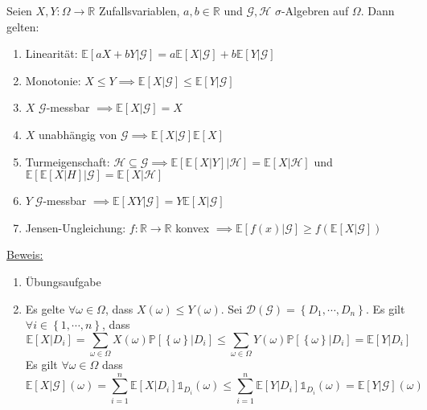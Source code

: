 Seien $ X, Y : \Omega  \to \mathbb{R} $ Zufallsvariablen, $ a,b \in \mathbb{R} $ und $ \mathcal{G}, \mathcal{H}  $ $\sigma$-Algebren auf 
$ \Omega  $. Dann gelten:
\begin{enumerate}[label=\alph*)]
	\item Linearität: $ \mathbb{E} \left[ aX + bY | \mathcal{G} \right] = a \mathbb{E} \left[ X | \mathcal{G} \right] + b \mathbb{E} \left[ Y | \mathcal{G}\right] $ 
	\item Monotonie: $ X \leq Y \implies \mathbb{E} \left[ X | \mathcal{G} \right] \leq \mathbb{E} \left[ Y | \mathcal{G} \right] $ 
	\item $ X  $ $ \mathcal{G}$-messbar $ \implies \mathbb{E} \left[ X | \mathcal{G} \right] = X $  
	\item $ X $ unabhängig von $ \mathcal{G}  \implies \mathbb{E} \left[ X  | \mathcal{G} \right] \mathbb{E} \left[ X \right]$ 
	\item Turmeigenschaft: $ \mathcal{H} \subseteq \mathcal{G} \implies \mathbb{E} \left[ \mathbb{E} \left[ X | Y \right] | \mathcal{H} \right] = \mathbb{E} \left[ X | \mathcal{H} \right] $ und $ \mathbb{E} \left[ \mathbb{E} \left[ X | H \right]| \mathcal{G} \right] = \mathbb{E} \left[ X | \mathcal{H} \right] $ 
	\item $ Y \; \mathcal{G}$-messbar $ \implies \mathbb{E} \left[ X Y | \mathcal{G} \right] = Y \mathbb{E} \left[ X | \mathcal{G} \right] $
	\item Jensen-Ungleichung: $ f : \mathbb{R} \to \mathbb{R}  $ konvex $ \implies \mathbb{E} \left[ f (x) | \mathcal{G} \right] \geq 
		f \left( \mathbb{E} \left[ X | \mathcal{G} \right] \right)$ 
\end{enumerate}

\underline{Beweis:} \begin{enumerate}[label=\alph*)]
	\item Übungsaufgabe
	\item Es gelte $ \forall \omega  \in \Omega  $, dass $ X (\omega) \leq Y (\omega) $. Sei $ \mathcal{D} (\mathcal{G}) =  \left\{ D_1 , \cdots,  D_n \right\}$. Es gilt $ \forall i \in \left\{ 1 , \cdots,  n \right\} $, dass 
		$$ \mathbb{E} \left[ X | D_i \right] = \sum_{\omega  \in \Omega } X (\omega) \mathbb{P} \left[ \left\{ \omega  \right\} | D_i \right] \leq \sum_{\omega  \in \Omega } Y (\omega) \mathbb{P} \left[ \left\{ \omega  \right\} | D_i \right] = \mathbb{E} \left[ Y | D_i \right] $$
Es gilt $ \forall \omega  \in \Omega  $ dass
$$ \mathbb{E} \left[ X | \mathcal{G} \right] (\omega) = \sum_{i=1}^{n} \mathbb{E} \left[ X | D_i \right] \mathbb{1}_{D_i} (\omega) \leq \sum_{i=1}^{n} \mathbb{E} \left[ Y | D_i \right] \mathbb{1}_{D_i} (\omega) = \mathbb{E} \left[ Y | \mathcal{G} \right] (\omega)$$
\end{enumerate}


